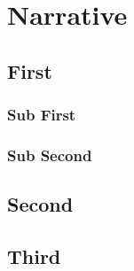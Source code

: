 
\chapter{Narrative}
\label{sec:narrative} %






\lipsum

\section{First}
\subsection{Sub First}
\subsection{Sub Second}
\section{Second}
\section{Third}